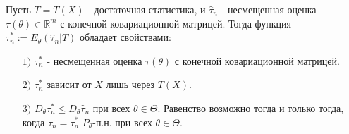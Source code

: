 \begin{theorem}\label{cha:7/the:2}
	Пусть $T = T(X)$ - достаточная статистика,  и $\hat{\tau}_n$ - несмещенная оценка $\tau (\theta) \in \mathbb{R}^m$ с конечной ковариационной матрицей. Тогда функция $\displaystyle \tau_n^* := E_{\theta} (\hat{\tau}_n | T)$ обладает свойствами:
	\begin{itemize}
		\item[$1)$]
			$\tau_n^*$ - несмещенная оценка $\tau (\theta)$ с конечной ковариационной матрицей.
		\item[$2)$]
			$\tau_n^*$ зависит от $X$ лишь через $T(X)$.
		\item[$3)$]
			$\displaystyle D_{\theta} \tau_n^* \le D_{\theta}\hat{\tau}_n$ при всех $\theta \in \Theta$. Равенство возможно тогда и только тогда, когда $\hat{\tau}_n = \tau_n^*$ $P_{\theta}$-п.н. при всех $\theta \in \Theta$.
	\end{itemize}
\end{theorem}
